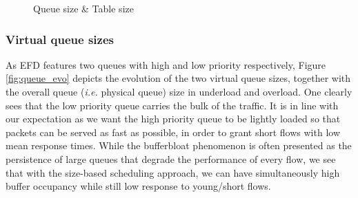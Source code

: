 \documentclass[preprint,12pt]{elsarticle}
\begin{document}
\begin{figure}[ht]
  \centering
  \caption{Queue size \& Table size}
  \label{fig:dynamics}
\end{figure}

\subsubsection{Virtual queue sizes}

As EFD features two queues with high and low priority respectively, Figure \ref{fig:queue_evo} depicts the evolution of the two virtual queue sizes, together with the overall queue (\textit{i.e.} physical queue) size in underload and overload. One clearly sees that the low priority queue carries the bulk of the traffic. It is in line with our expectation as we want the high priority queue to be lightly loaded so that packets can be served as fast as possible, in order to grant short flows with low mean response times. While the bufferbloat phenomenon is often presented as the persistence of large queues that degrade the performance of every flow, we see that with the size-based scheduling approach, we can have simultaneously high buffer occupancy while still low response to young/short flows.
\end{document}
